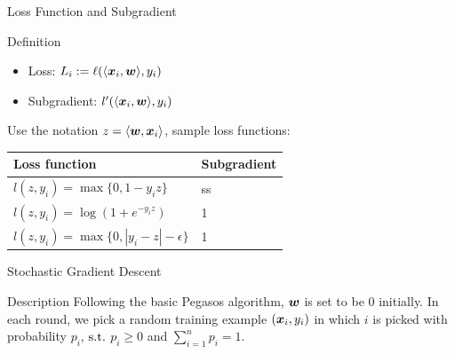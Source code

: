 \begin{frame}{Loss Function and Subgradient}
    \begin{block}{Definition}
        \begin{itemize}
            \item Loss: $L_i := \ell(\langle \bm{x}_i, \bm{w} \rangle, y_i)$

            \item Subgradient: $l'(\langle \bm{x}_i, \bm{w} \rangle, y_i)$
        \end{itemize}
    \end{block}
    Use the notation $z=\langle \bm{w}, \bm{x}_i\rangle$, sample loss functions:
    \begin{table}[h]
        \begin{tabular}{|l|l|}
            \hline
            Loss function & Subgradient  \\ \hline
            $l(z,y_i) = \max\{0,1-y_i z\}$ & ss \\ \hline%
            $l(z,y_i) = \log(1+e^{-y_iz})$ & 1\\ \hline
            $l(z,y_i) = \max\{0, | y_i - z| - \epsilon\}$ & 1 \\ \hline
        \end{tabular}
    \end{table}
\end{frame}

\begin{frame}{Stochastic Gradient Descent}
    \begin{block}{Description}
       Following the basic Pegasos algorithm, $\bm{w}$ is set to be $0$ initially. In each round, we pick a random training example $(\bm{x}_i, y_i)$ in which $i$ is picked with probability $p_i$, $\operatorname{\textrm{s.t.}}$ $p_i\ge0$ and $\sum_{i=1}^n p_i=1$. 
    \end{block}
\end{frame}


